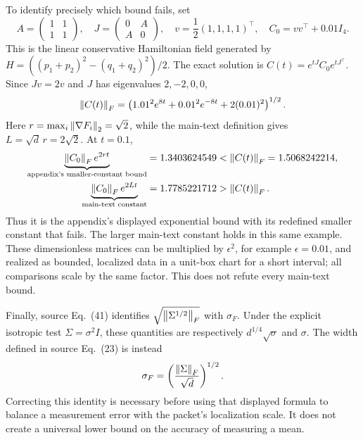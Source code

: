 To identify precisely which bound fails, set
\begin{equation}
 A=\begin{pmatrix}1&1\\1&1\end{pmatrix},\quad
 J=\begin{pmatrix}0&A\\A&0\end{pmatrix},\quad
 v=\frac12(1,1,1,1)^\top,\quad C_0=vv^\top+0.01I_4.
 \label{eq:dense-covariance-data}
\end{equation}
This is the linear conservative Hamiltonian field generated by
$H=((p_1+p_2)^2-(q_1+q_2)^2)/2$. The exact solution is
$C(t)=e^{tJ}C_0e^{tJ^\top}$. Since $Jv=2v$ and $J$ has eigenvalues
$2,-2,0,0$,
\begin{equation}
 \left\lVert C(t)\right\rVert_F=
 \left(1.01^2e^{8t}+0.01^2e^{-8t}+2(0.01)^2\right)^{1/2}.
 \label{eq:dense-covariance-exact}
\end{equation}
Here $r=\max_i\left\lVert \nabla F_i\right\rVert_2=\sqrt2$, while the main-text definition
gives $L=\sqrt d\,r=2\sqrt2$. At $t=0.1$,
\begin{align}
 \underbrace{\left\lVert C_0\right\rVert_F e^{2rt}}_{\text{appendix's smaller-constant bound}}
 &=1.3403624549 < \left\lVert C(t)\right\rVert_F=1.5068242214,\\
 \underbrace{\left\lVert C_0\right\rVert_F e^{2Lt}}_{\text{main-text constant}}
 &=1.7785221712 > \left\lVert C(t)\right\rVert_F.
 \label{eq:dense-covariance-comparison}
\end{align}
Thus it is the appendix's displayed exponential bound with its redefined
smaller constant that fails. The larger main-text constant holds in this
same example. These dimensionless matrices can be multiplied by
$\epsilon^2$, for example $\epsilon=0.01$, and realized as bounded,
localized data in a unit-box chart for a short interval; all comparisons
scale by the same factor. This does not refute every main-text bound.

Finally, source Eq.~(41) identifies
$\sqrt{\left\lVert \Sigma^{1/2}\right\rVert_F}$ with $\sigma_F$. Under the explicit isotropic
test $\Sigma=\sigma^2I$, these quantities are respectively
$d^{1/4}\sqrt\sigma$ and $\sigma$. The width defined in source Eq.~(23) is
instead
\begin{equation}
 \sigma_F=\left(\frac{\left\lVert \Sigma\right\rVert_F}{\sqrt d}\right)^{1/2}.
\end{equation}
Correcting this identity is necessary before using that displayed formula to
balance a measurement error with the packet's localization scale. It does
not create a universal lower bound on the accuracy of measuring a mean.
